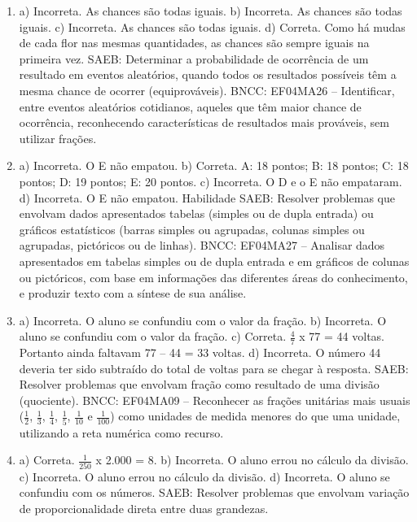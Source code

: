 \begin{enumerate}
\item
a) Incorreta. As chances são todas iguais.
b) Incorreta. As chances são todas iguais.
c) Incorreta. As chances são todas iguais.
d) Correta. Como há mudas de cada flor nas mesmas quantidades, as chances são sempre iguais na primeira vez.
SAEB: Determinar a probabilidade de ocorrência de um
resultado em eventos aleatórios, quando todos os resultados possíveis
têm a mesma chance de ocorrer (equiprováveis).
BNCC: EF04MA26 -- Identificar, entre eventos aleatórios cotidianos, aqueles que têm maior chance de
ocorrência, reconhecendo características de resultados mais prováveis, sem utilizar frações.

\item
a) Incorreta. O E não empatou.
b) Correta. A: 18 pontos; B: 18 pontos; C: 18 pontos; D: 19 pontos; E: 20 pontos.
c) Incorreta. O D e o E não empataram.
d) Incorreta. O E não empatou.
Habilidade SAEB: Resolver problemas que envolvam dados apresentados tabelas (simples ou
de dupla entrada) ou gráficos estatísticos (barras simples ou agrupadas,
colunas simples ou agrupadas, pictóricos ou de linhas).
BNCC: EF04MA27 -- Analisar dados apresentados em tabelas simples ou de dupla entrada e em gráficos de
colunas ou pictóricos, com base em informações das diferentes áreas do conhecimento, e produzir
texto com a síntese de sua análise.

\item
a) Incorreta. O aluno se confundiu com o valor da fração.
b) Incorreta. O aluno se confundiu com o valor da fração.
c) Correta. $\frac{4}{7}$ x 77 = 44 voltas. Portanto ainda faltavam 77 -- 44 = 33 voltas.
d) Incorreta. O número 44 deveria ter sido subtraído do total de voltas para se chegar à resposta.
SAEB: Resolver problemas que envolvam fração como resultado
de uma divisão (quociente).
BNCC: EF04MA09 -- Reconhecer as frações unitárias mais usuais ($\frac{1}{2}$, $\frac{1}{3}$, $\frac{1}{4}$, $\frac{1}{5}$, $\frac{1}{10}$ e $\frac{1}{100}$) como
unidades de medida menores do que uma unidade, utilizando a reta numérica como recurso.

\item
a) Correta. $\frac{1}{250}$ x 2.000 = 8.
b) Incorreta. O aluno errou no cálculo da divisão.
c) Incorreta. O aluno errou no cálculo da divisão.
d) Incorreta. O aluno se confundiu com os números.
SAEB: Resolver problemas que envolvam variação de proporcionalidade direta entre duas grandezas.


\end{enumerate}
